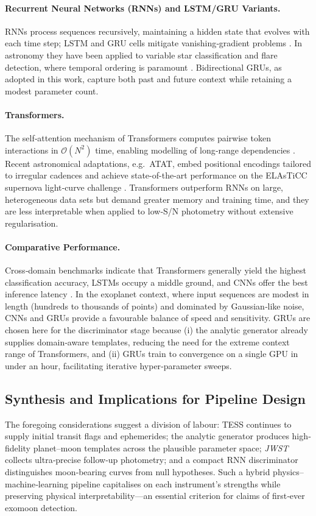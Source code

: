 \documentclass[11pt]{article}
\begin{document}
\paragraph{Recurrent Neural Networks (RNNs) and LSTM/GRU Variants.}
RNNs process sequences recursively, maintaining a hidden state that evolves with each time step; LSTM and GRU cells mitigate vanishing‐gradient problems \citep{rnnreview23}.  
In astronomy they have been applied to variable star classification and flare detection, where temporal ordering is paramount \citep{lstmvars21}.  
Bidirectional GRUs, as adopted in this work, capture both past and future context while retaining a modest parameter count.

\paragraph{Transformers.}
The self‐attention mechanism of Transformers computes pairwise token interactions in $\mathcal{O}(N^{2})$ time, enabling modelling of long‐range dependencies \citep{timesurvey23}.  
Recent astronomical adaptations, e.g.\ ATAT, embed positional encodings tailored to irregular cadences and achieve state-of-the-art performance on the ELAsTiCC supernova light‐curve challenge \citep{atat24}.  
Transformers outperform RNNs on large, heterogeneous data sets but demand greater memory and training time, and they are less interpretable when applied to low‐S/N photometry without extensive regularisation.

\paragraph{Comparative Performance.}
Cross‐domain benchmarks indicate that Transformers generally yield the highest classification accuracy, LSTMs occupy a middle ground, and CNNs offer the best inference latency \citep{cnnvsall24,realperf24}.  
In the exoplanet context, where input sequences are modest in length (hundreds to thousands of points) and dominated by Gaussian‐like noise, CNNs and GRUs provide a favourable balance of speed and sensitivity.  
GRUs are chosen here for the discriminator stage because (i) the analytic generator already supplies domain‐aware templates, reducing the need for the extreme context range of Transformers, and (ii) GRUs train to convergence on a single GPU in under an hour, facilitating iterative hyper‐parameter sweeps.

\subsection{Synthesis and Implications for Pipeline Design}
The foregoing considerations suggest a division of labour:  
TESS continues to supply initial transit flags and ephemerides; the analytic generator produces high‐fidelity planet–moon templates across the plausible parameter space; \textit{JWST} collects ultra‐precise follow‐up photometry; and a compact RNN discriminator distinguishes moon‐bearing curves from null hypotheses.  
Such a hybrid physics–machine‐learning pipeline capitalises on each instrument’s strengths while preserving physical interpretability—an essential criterion for claims of first‐ever exomoon detection.
\end{document}
